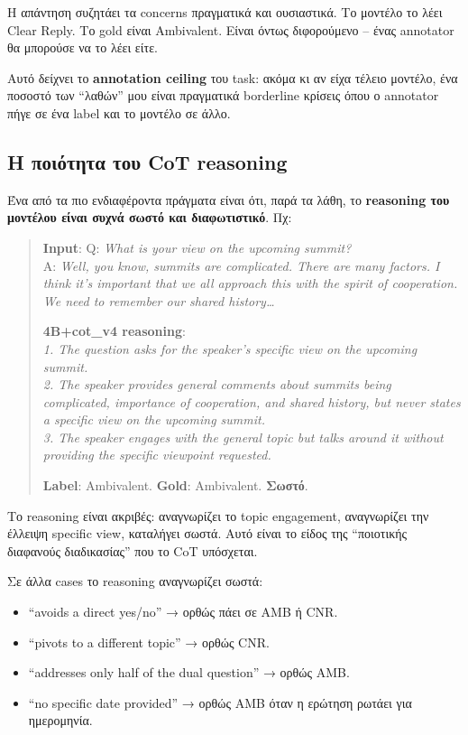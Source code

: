 \documentclass[12pt]{fphw}
\begin{document}
Η απάντηση συζητάει τα concerns πραγματικά και ουσιαστικά. Το μοντέλο το λέει Clear Reply. Το gold είναι Ambivalent. Είναι όντως διφορούμενο -- ένας annotator θα μπορούσε να το λέει είτε.

Αυτό δείχνει το \textbf{annotation ceiling} του task: ακόμα κι αν είχα τέλειο μοντέλο, ένα ποσοστό των ``λαθών'' μου είναι πραγματικά borderline κρίσεις όπου ο annotator πήγε σε ένα label και το μοντέλο σε άλλο.

\subsection{Η ποιότητα του CoT reasoning}

Ένα από τα πιο ενδιαφέροντα πράγματα είναι ότι, παρά τα λάθη, το \textbf{reasoning του μοντέλου είναι συχνά σωστό και διαφωτιστικό}. Πχ:

\begin{quote}
\textbf{Input}: Q: \emph{What is your view on the upcoming summit?}\\
A: \emph{Well, you know, summits are complicated. There are many factors. I think it's important that we all approach this with the spirit of cooperation. We need to remember our shared history\dots}

\textbf{4B+cot\_v4 reasoning}:\\
\emph{1. The question asks for the speaker's specific view on the upcoming summit.\\
2. The speaker provides general comments about summits being complicated, importance of cooperation, and shared history, but never states a specific view on the upcoming summit.\\
3. The speaker engages with the general topic but talks around it without providing the specific viewpoint requested.}

\textbf{Label}: Ambivalent. \textbf{Gold}: Ambivalent. \textbf{Σωστό}.
\end{quote}

Το reasoning είναι ακριβές: αναγνωρίζει το topic engagement, αναγνωρίζει την έλλειψη specific view, καταλήγει σωστά. Αυτό είναι το είδος της ``ποιοτικής διαφανούς διαδικασίας'' που το CoT υπόσχεται.

Σε άλλα cases το reasoning αναγνωρίζει σωστά:

\begin{itemize}
    \item ``avoids a direct yes/no'' → ορθώς πάει σε AMB ή CNR.
    \item ``pivots to a different topic'' → ορθώς CNR.
    \item ``addresses only half of the dual question'' → ορθώς AMB.
    \item ``no specific date provided'' → ορθώς AMB όταν η ερώτηση ρωτάει για ημερομηνία.
\end{itemize}
\end{document}
